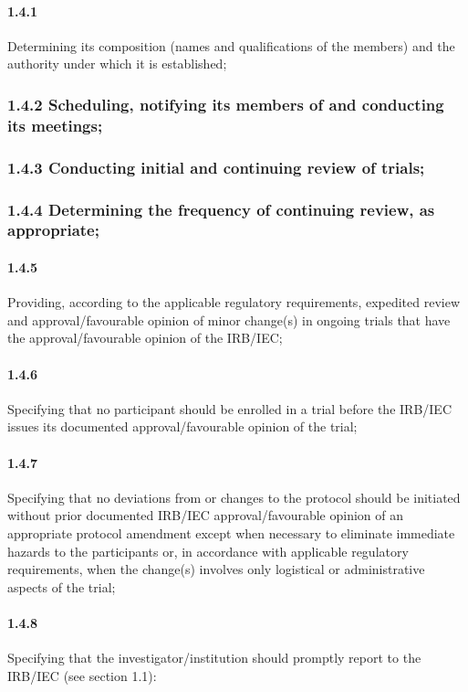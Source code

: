 \documentclass[11pt]{article}
\begin{document}
\paragraph{1.4.1} Determining its composition (names and qualifications of the members) and the authority under which it is established;

\subsubsection{1.4.2 Scheduling, notifying its members of and conducting its meetings;}

\subsubsection{1.4.3 Conducting initial and continuing review of trials;}

\subsubsection{1.4.4 Determining the frequency of continuing review, as appropriate;}

\paragraph{1.4.5} Providing, according to the applicable regulatory requirements, expedited review and approval/favourable opinion of minor change(s) in ongoing trials that have the approval/favourable opinion of the IRB/IEC;

\paragraph{1.4.6} Specifying that no participant should be enrolled in a trial before the IRB/IEC issues its documented approval/favourable opinion of the trial;

\paragraph{1.4.7} Specifying that no deviations from or changes to the protocol should be initiated without prior documented IRB/IEC approval/favourable opinion of an appropriate protocol amendment except when necessary to eliminate immediate hazards to the participants or, in accordance with applicable regulatory requirements, when the change(s) involves only logistical or administrative aspects of the trial;

\paragraph{1.4.8} Specifying that the investigator/institution should promptly report to the IRB/IEC (see section 1.1):
\end{document}
